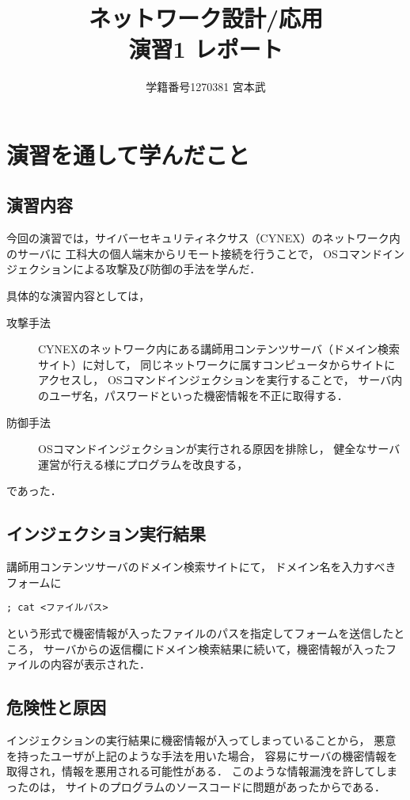\documentclass{jlreq}
\title{ネットワーク設計/応用 \\ \vspace{0.3cm} 演習1 レポート}
\author{学籍番号1270381 宮本武}
\begin{document}
\maketitle

\section{演習を通して学んだこと}
\subsection{演習内容}
今回の演習では，サイバーセキュリティネクサス（CYNEX）のネットワーク内のサーバに
工科大の個人端末からリモート接続を行うことで，
OSコマンドインジェクションによる攻撃及び防御の手法を学んだ．

具体的な演習内容としては，
\begin{description}
    \item[攻撃手法]
    CYNEXのネットワーク内にある講師用コンテンツサーバ（ドメイン検索サイト）に対して，
    同じネットワークに属すコンピュータからサイトにアクセスし，
    OSコマンドインジェクションを実行することで，
    サーバ内のユーザ名，パスワードといった機密情報を不正に取得する．

    \vspace{0.3cm}
    \item[防御手法] 
    OSコマンドインジェクションが実行される原因を排除し，
    健全なサーバ運営が行える様にプログラムを改良する，
\end{description}
であった．

\subsection{インジェクション実行結果}
講師用コンテンツサーバのドメイン検索サイトにて，
ドメイン名を入力すべきフォームに
\begin{lstlisting}[frame={tblr}]
; cat <ファイルパス>
\end{lstlisting}
という形式で機密情報が入ったファイルのパスを指定してフォームを送信したところ，
サーバからの返信欄にドメイン検索結果に続いて，機密情報が入ったファイルの内容が表示された．
\subsection{危険性と原因}
インジェクションの実行結果に機密情報が入ってしまっていることから，
悪意を持ったユーザが上記のような手法を用いた場合，
容易にサーバの機密情報を取得され，情報を悪用される可能性がある．
このような情報漏洩を許してしまったのは，
サイトのプログラムのソースコードに問題があったからである．
\end{document}
